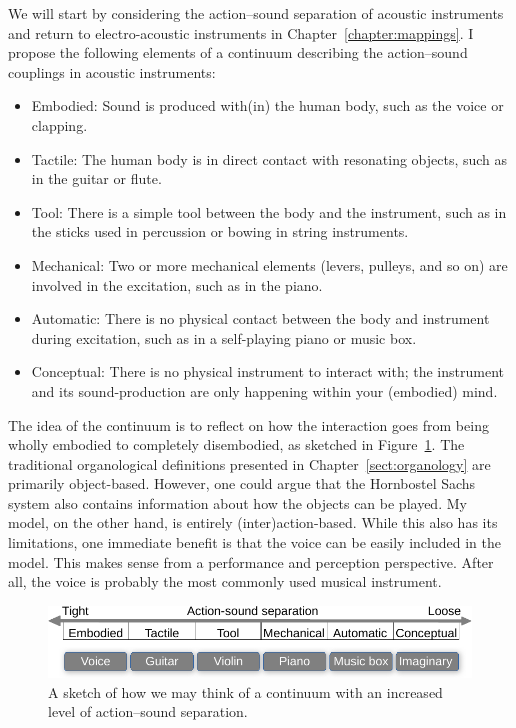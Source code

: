 We will start by considering the action--sound separation of acoustic instruments and return to electro-acoustic instruments in Chapter~\ref{chapter:mappings}. I propose the following elements of a continuum describing the action--sound couplings in acoustic instruments:

\begin{itemize}
  \item Embodied: Sound is produced with(in) the human body, such as the voice or clapping.
  \item Tactile: The human body is in direct contact with resonating objects, such as in the guitar or flute.
  \item Tool: There is a simple tool between the body and the instrument, such as in the sticks used in percussion or bowing in string instruments.
  \item Mechanical: Two or more mechanical elements (levers, pulleys, and so on) are involved in the excitation, such as in the piano.
  \item Automatic: There is no physical contact between the body and instrument during excitation, such as in a self-playing piano or music box.
  \item Conceptual: There is no physical instrument to interact with; the instrument and its sound-production are only happening within your (embodied) mind.
\end{itemize}

The idea of the continuum is to reflect on how the interaction goes from being wholly embodied to completely disembodied, as sketched in Figure~\ref{fig:instrument7}.
The traditional organological definitions presented in Chapter~\ref{sect:organology} are primarily object-based. However, one could argue that the Hornbostel Sachs system also contains information about how the objects can be played. My model, on the other hand, is entirely (inter)action-based. While this also has its limitations, one immediate benefit is that the voice can be easily included in the model. This makes sense from a performance and perception perspective. After all, the voice is probably the most commonly used musical instrument.

\begin{figure}[tbp]
      \includegraphics[width=\columnwidth]{figures/41-separation-crop.pdf}
      \caption{A sketch of how we may think of a continuum with an increased level of action--sound separation.}
            \label{fig:instrument7}
\end{figure}

